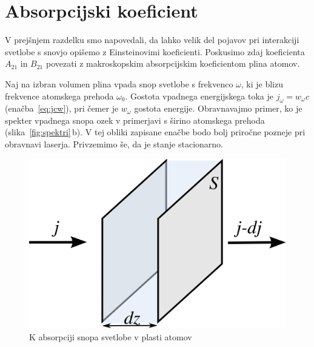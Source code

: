 \section{Absorpcijski koeficient}

V prejšnjem razdelku smo napovedali, da lahko velik del pojavov pri interakciji 
svetlobe s snovjo opišemo z Einsteinovimi koeficienti. Poskusimo zdaj 
koeficienta $A_{21}$ in $B_{21}$ povezati z makroskopskim absorpcijskim
koeficientom plina atomov. 

Naj na izbran volumen plina vpada snop svetlobe s frekvenco
$\omega$, ki je blizu frekvence atomskega prehoda $\omega_{0}$. Gostota
vpadnega energijskega toka je $j_{\omega}=w_{\omega}c$ (enačba~\ref{eq:jcw}), 
pri čemer je $w_{\omega}$ gostota energije. Obravnavajmo primer, ko je 
spekter vpadnega snopa ozek v primerjavi s širino atomskega prehoda
(slika~\ref{fig:spektri}\,b). V tej obliki zapisane enačbe bodo bolj 
priročne pozneje pri obravnavi laserja. Privzemimo še, da
je stanje stacionarno. 
\begin{figure}[h]
\centering
\includegraphics[width=6truecm]{slike/05_Absorpcija.png}
\caption{K absorpciji snopa svetlobe v plasti atomov}
\label{fig:abs}
\end{figure}
 

